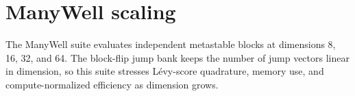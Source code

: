 \section{ManyWell scaling}
The ManyWell suite evaluates independent metastable blocks at dimensions 8, 16, 32, and 64. The block-flip jump bank keeps the number of jump vectors linear in dimension, so this suite stresses L\'evy-score quadrature, memory use, and compute-normalized efficiency as dimension grows.
